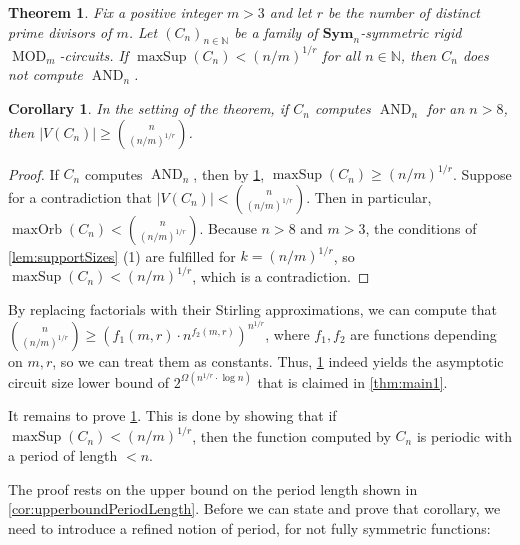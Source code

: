 \documentclass[11pt]{article}
\DeclareMathOperator{\MOD}{MOD}
\DeclareMathOperator{\AND}{AND}
\DeclareMathOperator{\maxSup}{maxSup}
\newcommand{\Sym}{\mathbf{Sym}}
\newcommand{\bbN}{\mathbb{N}}
\theoremstyle{definition}
\theoremstyle{plain}
\newtheorem{corollary}[definition]{Corollary}
\newtheorem{theorem}[definition]{Theorem}
\theoremstyle{remark}
\theoremstyle{remark}
\newcommand{\maxorb}{\operatorname{maxOrb}}
\begin{document}
\begin{theorem}
\label{thm:mainSupportLowerBound}
Fix a positive integer $m > 3$ and let $r$ be the number of distinct prime divisors of $m$.
Let $(C_n)_{n \in \bbN}$ be a family of $\Sym_n$-symmetric rigid $\MOD_m$-circuits. 
If $\maxSup(C_n) < (n/m)^{1/r}$ for all $n \in \bbN$, then $C_n$ does not compute $\AND_n$.
\end{theorem}


\begin{corollary}
\label{cor:sizeLowerBound}
In the setting of the theorem,
if $C_n$ computes $\AND_n$ for an $n > 8$, then
$|V(C_n)| \geq \binom{n}{(n/m)^{1/r}}$.
\end{corollary}
\begin{proof}
	If $C_n$ computes $\AND_n$, then by \cref{thm:mainSupportLowerBound}, $\maxSup(C_n) \geq (n/m)^{1/r}$. 
	Suppose for a contradiction that $|V(C_n)| < \binom{n}{(n/m)^{1/r}}$. Then in particular, $\maxorb(C_n) < \binom{n}{(n/m)^{1/r}}$. Because $n > 8$ and $m > 3$, the conditions of \cref{lem:supportSizes} (1) are fulfilled for $k = (n/m)^{1/r}$, so $\maxSup(C_n) < (n/m)^{1/r}$, which is a contradiction.
\end{proof}	

By replacing factorials with their Stirling approximations, we can compute that 
$\binom{n}{(n/m)^{1/r}} \geq (f_1(m,r) \cdot n^{f_2(m,r)})^{n^{1/r}}$, where $f_1, f_2$ are functions depending on $m,r$, so we can treat them as constants. Thus, \cref{cor:sizeLowerBound} indeed yields the asymptotic circuit size lower bound of $2^{\Omega(n^{1/r} \cdot \log n)}$ that is claimed in \cref{thm:main1}.

It remains to prove \cref{thm:mainSupportLowerBound}. This is done by showing that if $\maxSup(C_n) < (n/m)^{1/r}$, then the function computed by $C_n$ is periodic with a period of length $<n$. 



The proof rests on the upper bound on the period length shown in \cref{cor:upperboundPeriodLength}. 
Before we can state and prove that corollary, we need to introduce a refined notion of period, for not fully symmetric functions: 
\end{document}
